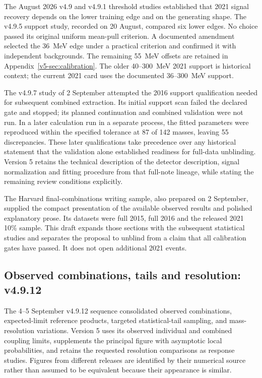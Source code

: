 The August 2026 v4.9 and v4.9.1 threshold studies established that 2021
signal recovery depends on the lower training edge and on the generating
shape. The v4.9.5 support study, recorded on 20 August, compared six
lower edges. No choice passed its original uniform mean-pull criterion.
A documented amendment selected the 36~MeV edge under a practical
criterion and confirmed it with independent backgrounds. The remaining
55~MeV offsets are retained in Appendix~\ref{v5-sec:calibration}.
The older 40--300~MeV 2021 support is historical context; the current
2021 card uses the documented 36--300~MeV support.

The v4.9.7 study of 2 September attempted the 2016 support qualification
needed for subsequent combined extraction. Its initial support scan failed
the declared gate and stopped; its planned continuation and combined
validation were not run. In a later calculation run in a separate process, the fitted parameters
were reproduced within the specified tolerance at 87 of 142 masses,
leaving 55 discrepancies. These later qualifications take precedence over any
historical statement that the validation alone established readiness for
full-data unblinding. Version 5 retains the technical description of the
detector description, signal normalization and fitting procedure from that
full-note lineage, while stating the remaining review conditions explicitly.

The Harvard final-combinations writing sample, also prepared on
2 September, supplied the compact presentation of the available observed
results and polished explanatory prose. Its datasets were full 2015,
full 2016 and the released 2021 10\% sample. This draft expands those
sections with the subsequent statistical studies and separates the
proposal to unblind from a claim that all calibration gates have passed.
It does not open additional 2021 events.

\subsection{Observed combinations, tails and resolution: v4.9.12}
The 4--5 September v4.9.12 sequence consolidated observed combinations,
expected-limit reference products, targeted statistical-tail sampling,
and mass-resolution variations. Version 5 uses its observed individual
and combined coupling limits, supplements the principal figure with
asymptotic local probabilities, and retains the requested resolution
comparisons as response studies. Figures from different releases are
identified by their numerical source rather than assumed to be equivalent
because their appearance is similar.

